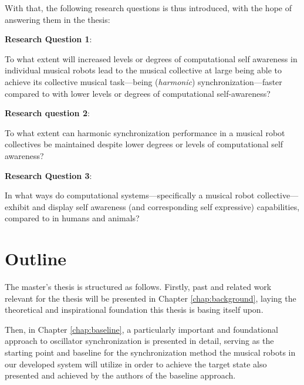 With that, the following research questions is thus introduced, with the hope of answering them in the thesis: \nl

\textbf{Research Question 1}:

To what extent will increased levels or degrees of computational self awareness in individual musical robots lead to the musical collective at large being able to achieve its collective musical task—being (\textit{harmonic}) synchronization—faster compared to with lower levels or degrees of computational self-awareness? \nl

\textbf{Research question 2}:

To what extent can harmonic synchronization performance in a musical robot collectives be maintained despite lower degrees or levels of computational self awareness? \nl

\textbf{Research Question 3}:

In what ways do computational systems—specifically a musical robot collective—exhibit and display self awareness (and corresponding self expressive) capabilities, compared to in humans and animals? \nl







\section{Outline}

The master's thesis is structured as follows. Firstly, past and related work relevant for the thesis will be presented in Chapter \ref{chap:background}, laying the theoretical and inspirational foundation this thesis is basing itself upon.

Then, in Chapter \ref{chap:baseline}, a particularly important and foundational approach to oscillator synchronization is presented in detail, serving as the starting point and baseline for the synchronization method the musical robots in our developed system will utilize in order to achieve the target state also presented and achieved by the authors of the baseline approach.

